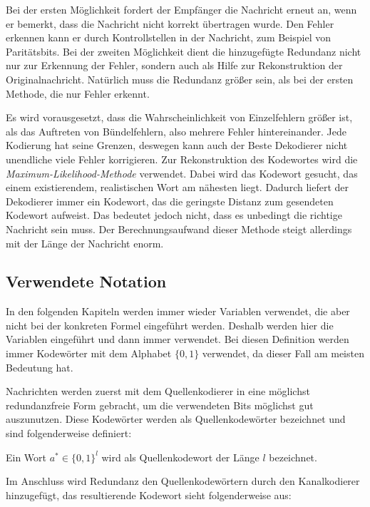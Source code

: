 Bei der ersten Möglichkeit fordert der Empfänger die Nachricht erneut an, wenn er bemerkt, dass die Nachricht nicht korrekt übertragen wurde. Den Fehler erkennen kann er durch Kontrollstellen in der Nachricht, zum Beispiel von Paritätsbits. Bei der zweiten Möglichkeit dient die hinzugefügte Redundanz nicht nur zur Erkennung der Fehler, sondern auch als Hilfe zur Rekonstruktion der Originalnachricht. Natürlich muss die Redundanz größer sein, als bei der ersten Methode, die nur Fehler erkennt.

Es wird vorausgesetzt, dass die Wahrscheinlichkeit von Einzelfehlern größer ist, als das Auftreten von Bündelfehlern, also mehrere Fehler hintereinander. Jede Kodierung hat seine Grenzen, deswegen kann auch der Beste Dekodierer nicht unendliche viele Fehler korrigieren. Zur Rekonstruktion des Kodewortes wird die \emph{Maximum-Likelihood-Methode} verwendet. Dabei wird das Kodewort gesucht, das einem existierendem, realistischen Wort am nähesten liegt. Dadurch liefert der Dekodierer immer ein Kodewort, das die geringste Distanz zum gesendeten Kodewort aufweist. Das bedeutet jedoch nicht, dass es unbedingt die richtige Nachricht sein muss. Der Berechnungsaufwand dieser Methode steigt allerdings mit der Länge der Nachricht enorm. \cite[126-129]{schoenfeld2012informations} 

\subsection{Verwendete Notation}
\label{sec:notation}
In den folgenden Kapiteln werden immer wieder Variablen verwendet, die aber nicht bei der konkreten Formel eingeführt werden. Deshalb werden hier die Variablen eingeführt und dann immer verwendet. Bei diesen Definition werden immer Kodewörter mit dem Alphabet $\{0,1\}$ verwendet, da dieser Fall am meisten Bedeutung hat.

Nachrichten werden zuerst mit dem Quellenkodierer in eine möglichst redundanzfreie Form gebracht, um die verwendeten Bits möglichst gut auszunutzen. Diese Kodewörter werden als Quellenkodewörter bezeichnet und sind folgenderweise definiert:

\begin{t_def}
Ein Wort $a^* \in \{0,1\}^l$ wird als Quellenkodewort der Länge $l$ bezeichnet.
\end{t_def}

Im Anschluss wird Redundanz den Quellenkodewörtern durch den Kanalkodierer hinzugefügt, das resultierende Kodewort sieht folgenderweise aus:

